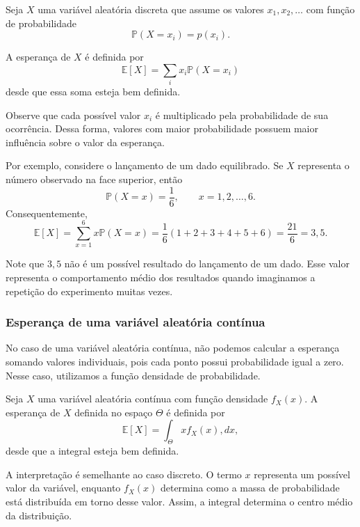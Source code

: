 Seja $X$ uma variável aleatória discreta que assume os valores $x_1,x_2,\ldots$ com função de probabilidade
\begin{equation}
\mathbb P(X=x_i)=p(x_i).
\end{equation}

A esperança de $X$ é definida por
\begin{equation}
    \mathbb{E}[X]=\sum_i x_i\mathbb P(X=x_i)
\end{equation}
desde que essa soma esteja bem definida.

Observe que cada possível valor $x_i$ é multiplicado pela probabilidade de sua ocorrência. Dessa forma, valores com maior probabilidade possuem maior influência sobre o valor da esperança.

Por exemplo, considere o lançamento de um dado equilibrado. Se $X$ representa o número observado na face superior, então
\begin{equation}
\mathbb P(X=x)=\frac{1}{6},\qquad x=1,2,\ldots,6.
\end{equation}
Consequentemente,
\begin{equation}
\mathbb{E}[X]=\sum_{x=1}^{6}x\mathbb P(X=x)=\frac{1}{6}(1+2+3+4+5+6)=\frac{21}{6}=3,5.
\end{equation}

Note que $3,5$ não é um possível resultado do lançamento de um dado. Esse valor representa o comportamento médio dos resultados quando imaginamos a repetição do experimento muitas vezes.

\subsubsection{Esperança de uma variável aleatória contínua}

No caso de uma variável aleatória contínua, não podemos calcular a esperança somando valores individuais, pois cada ponto possui probabilidade igual a zero. Nesse caso, utilizamos a função densidade de probabilidade.

Seja $X$ uma variável aleatória contínua com função densidade $f_X(x)$. A esperança de $X$ definida no espaço $\Theta$ é definida por
\begin{equation}
\mathbb{E}[X]
=\int_\Theta x f_X(x),dx,
\end{equation}
desde que a integral esteja bem definida.

A interpretação é semelhante ao caso discreto. O termo $x$ representa um possível valor da variável, enquanto $f_X(x)$ determina como a massa de probabilidade está distribuída em torno desse valor. Assim, a integral determina o centro médio da distribuição.


